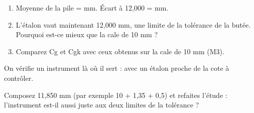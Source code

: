 \documentclass[10pt,a4paper]{article}
\begin{document}
\begin{enumerate}[label=\textcolor{cyan}{\textbf{Q\arabic*.}},leftmargin=22pt]
\item Moyenne de la pile = \champ{18mm} mm. Écart à 12,000 = \champ{18mm} mm.\par\vspace{5pt}
\item L'étalon vaut maintenant 12,000 mm, une limite de la tolérance de la butée. Pourquoi est-ce mieux que la cale de 10 mm ?\reponse[2]
\item Comparez Cg et Cgk avec ceux obtenus sur la cale de 10 mm (M3).\reponse[1]
\end{enumerate}
\begin{tcolorbox}[retenir]On vérifie un instrument là où il sert : avec un étalon proche de la cote à contrôler.\end{tcolorbox}
\begin{tcolorbox}[plus]Composez 11,850 mm (par exemple 10 + 1,35 + 0,5) et refaites l'étude : l'instrument est-il aussi juste aux deux limites de la tolérance ?\end{tcolorbox}
\end{document}
